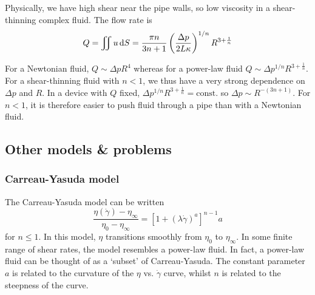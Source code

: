 \documentclass{jknotes}
\newcommand{\srate}{\dot{\gamma}}
\begin{document}
Physically, we have high shear near the pipe walls, so low viscosity in a
shear-thinning complex fluid. The flow rate is
\begin{equation}
	Q = \iint u \, \diffd S = \frac{\pi n}{3n+1} \left(\frac{\Delta p}{2 L
	\kappa}\right)^{1/n} R^{3+\frac{1}{n}}
\end{equation}

For a Newtonian fluid, $Q \sim \Delta p R^4$ whereas for a power-law fluid $Q
\sim \Delta p ^{1/n} R^{3+\frac{1}{n}}$. For a shear-thinning fluid with $n <
1$, we thus have a very strong dependence on $\Delta p$ and $R$. In a device
with $Q$ fixed, $\Delta p^{1/n} R^{3+\frac{1}{n}} = \text{const.}$ so $\Delta
p \sim R^{-(3n+1)}$. For $n < 1$, it is therefore easier to push fluid through
a pipe than with a Newtonian fluid.

\subsection{Other models \& problems}
\subsubsection{Carreau-Yasuda model}
The Carreau-Yasuda model can be written
\begin{equation}
	\frac{\eta(\srate)-\eta_\infty}{\eta_0 - \eta_\infty} = \left[ 1 +
	(\lambda \srate)^a\right]^{n-1}{a}
\end{equation}
for $n \le 1$. In this model, $\eta$ transitions smoothly from $\eta_0$ to
$\eta_\infty$. In some finite range of shear rates, the model resembles a
power-law fluid. In fact, a power-law fluid can be thought of as a `subset' of
Carreau-Yasuda. The constant parameter $a$ is related to the curvature of the
$\eta$ vs. $\srate$ curve, whilst $n$ is related to the steepness of the
curve.

\begin{center}
\end{center}
\end{document}
